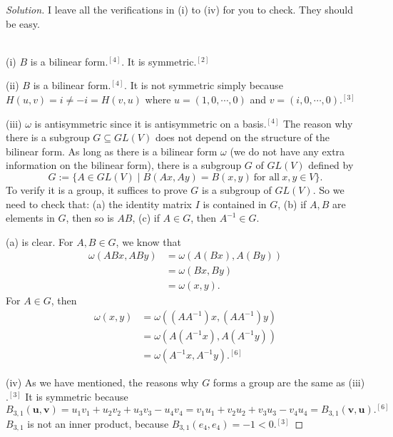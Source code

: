\documentclass{article}
\theoremstyle{definition}
\theoremstyle{plain}
\begin{document}
\begin{adjustwidth}{0.7cm}{}
\color{blue}
\begin{proof}[Solution]
I leave all the verifications in (i) to (iv) for you to check. They should be easy.\\
~\par
(i) $B$ is a bilinear form$.^{[4]}$. It is symmetric$.^{[2]}$\par
(ii) $B$ is a bilinear form$.^{[4]}$. It is not symmetric simply because $H(u,v)=i\neq-i=H(v,u)$ where $u=(1,0,\cdots,0)$ and $v=(i,0,\cdots,0).^{[3]}$\par
(iii) $\omega$ is antisymmetric since it is antisymmetric on a basis$.^{[4]}$ The reason why there is a subgroup $G\subseteq GL(V)$ does not depend on the structure of the bilinear form. As long as there is a bilinear form $\omega$ (we do not have any extra information on the bilinear form), there is a subgroup $G$ of $GL(V)$ defined by
\begin{displaymath}
G:=\{A\in GL(V)\mid B(Ax,Ay)=B(x,y)~\text{for all}~x,y\in V\}.
\end{displaymath}
To verify it is a group, it suffices to prove $G$ is a subgroup of $GL(V)$. So we need to check that: (a) the identity matrix $I$ is contained in $G$, (b) if $A,B$ are elements in $G$, then so is $AB$, (c) if $A\in G$, then $A^{-1}\in G$.\par
(a) is clear. For $A,B\in G$, we know that
\begin{align*}
\omega(ABx,ABy)&=\omega(A(Bx),A(By))\\
&=\omega(Bx,By)\\
&=\omega(x,y).
\end{align*}
For $A\in G$, then
\begin{align*}
\omega(x,y)&=\omega((AA^{-1})x,(AA^{-1})y)\\
&=\omega(A(A^{-1}x),A(A^{-1}y))\\
&=\omega(A^{-1}x,A^{-1}y).^{[6]}
\end{align*}\par
(iv) As we have mentioned, the reasons why $G$ forms a group are the same as (iii)$.^{[3]}$ It is symmetric because
\begin{displaymath}
B_{3,1}(\bm{u},\bm{v})=u_1v_1+u_2v_2+u_3v_3-u_4v_4=v_1u_1+v_2u_2+v_3u_3-v_4u_4=B_{3,1}(\bm{v},\bm{u}).^{[6]}
\end{displaymath}
$B_{3,1}$ is not an inner product, because $B_{3,1}(e_4,e_4)=-1<0.^{[3]}$
\color{black}
\end{proof}
\end{adjustwidth}
\end{document}
